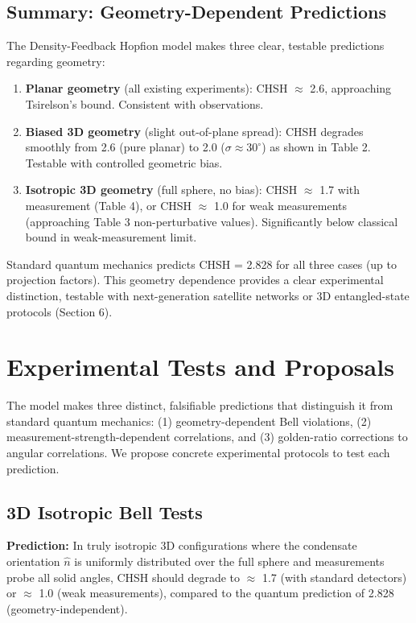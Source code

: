 \documentclass[11pt,a4paper]{article}
\theoremstyle{definition}
\theoremstyle{remark}
\begin{document}
\subsection{Summary: Geometry-Dependent Predictions}

The Density-Feedback Hopfion model makes three clear, testable predictions regarding geometry:

\begin{enumerate}
\item \textbf{Planar geometry} (all existing experiments): CHSH $\approx$ 2.6, approaching Tsirelson's bound. Consistent with observations.

\item \textbf{Biased 3D geometry} (slight out-of-plane spread): CHSH degrades smoothly from 2.6 (pure planar) to 2.0 ($\sigma \approx 30^\circ$) as shown in Table 2. Testable with controlled geometric bias.

\item \textbf{Isotropic 3D geometry} (full sphere, no bias): CHSH $\approx$ 1.7 with measurement (Table 4), or CHSH $\approx$ 1.0 for weak measurements (approaching Table 3 non-perturbative values). Significantly below classical bound in weak-measurement limit.
\end{enumerate}

Standard quantum mechanics predicts CHSH = 2.828 for all three cases (up to projection factors). This geometry dependence provides a clear experimental distinction, testable with next-generation satellite networks or 3D entangled-state protocols (Section 6).

\section{Experimental Tests and Proposals}
\label{P8:sec:experiments}

The model makes three distinct, falsifiable predictions that distinguish it from standard quantum mechanics: (1) geometry-dependent Bell violations, (2) measurement-strength-dependent correlations, and (3) golden-ratio corrections to angular correlations. We propose concrete experimental protocols to test each prediction.

\subsection{3D Isotropic Bell Tests}

\textbf{Prediction:} In truly isotropic 3D configurations where the condensate orientation $\hat{n}$ is uniformly distributed over the full sphere and measurements probe all solid angles, CHSH should degrade to $\approx$ 1.7 (with standard detectors) or $\approx$ 1.0 (weak measurements), compared to the quantum prediction of 2.828 (geometry-independent).
\end{document}
